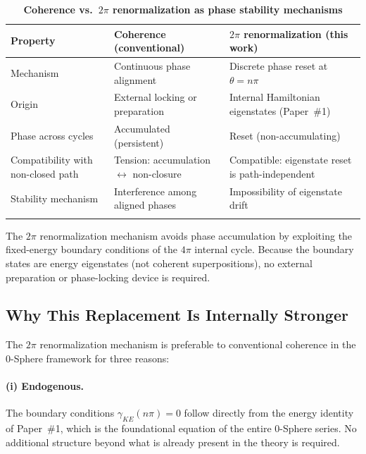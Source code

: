 \documentclass[%
 reprint, amsmath,amssymb, aps, prb, ]{revtex4-2}
\numberwithin{equation}{section}
\newcommand{\iphase}{\theta}
\begin{document}
\begin{table}[t!]
\centering
\caption{\textbf{Coherence vs.\ $2\pi$ renormalization as phase stability mechanisms}}
\label{tab:coherence_vs_renorm}
\renewcommand{\arraystretch}{1.4}
\begin{tabular}{p{3.5cm}p{5.5cm}p{6.5cm}}
\toprule
\textbf{Property} & \textbf{Coherence (conventional)} & \textbf{$2\pi$ renormalization (this work)} \\
\midrule
Mechanism
& Continuous phase alignment
& Discrete phase reset at $\iphase = n\pi$ \\
\addlinespace[0.3cm]
Origin
& External locking or preparation
& Internal Hamiltonian eigenstates (Paper~\#1) \\
\addlinespace[0.3cm]
Phase across cycles
& Accumulated (persistent)
& Reset (non-accumulating) \\
\addlinespace[0.3cm]
Compatibility with non-closed path
& Tension: accumulation $\leftrightarrow$ non-closure
& Compatible: eigenstate reset is path-independent \\
\addlinespace[0.3cm]
Stability mechanism
& Interference among aligned phases
& Impossibility of eigenstate drift \\
\addlinespace[0.2cm]
\bottomrule
\end{tabular}
\vspace{0.2cm}
\begin{minipage}{0.95\textwidth}
\justifying\footnotesize
The $2\pi$ renormalization mechanism avoids phase accumulation by exploiting the fixed-energy boundary conditions of the $4\pi$ internal cycle. Because the boundary states are energy eigenstates (not coherent superpositions), no external preparation or phase-locking device is required.
\end{minipage}
\end{table}

\subsection{Why This Replacement Is Internally Stronger}

The $2\pi$ renormalization mechanism is preferable to conventional coherence in the 0-Sphere framework for three reasons:

\paragraph{(i) Endogenous.}
The boundary conditions $\gamma_{KE}(n\pi) = 0$ follow directly from the energy identity of Paper~\#1, which is the foundational equation of the entire 0-Sphere series.
No additional structure beyond what is already present in the theory is required.
\end{document}
